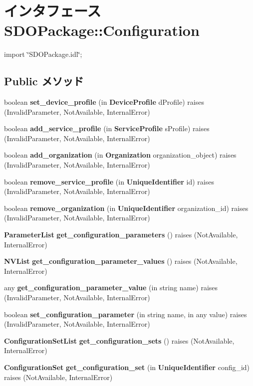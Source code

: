 \section{インタフェース SDOPackage::Configuration}
\label{interfaceSDOPackage_1_1Configuration}


{\ttfamily import \char`\"{}SDOPackage.idl\char`\"{};}

\subsection*{Public メソッド}
\begin{DoxyCompactItemize}
\item 
boolean {\bf set\_\-device\_\-profile} (in {\bf DeviceProfile} dProfile)  raises (InvalidParameter, NotAvailable, InternalError)
\item 
boolean {\bf add\_\-service\_\-profile} (in {\bf ServiceProfile} sProfile)  raises (InvalidParameter, NotAvailable, InternalError)
\item 
boolean {\bf add\_\-organization} (in {\bf Organization} organization\_\-object)  raises (InvalidParameter, NotAvailable, InternalError)
\item 
boolean {\bf remove\_\-service\_\-profile} (in {\bf UniqueIdentifier} id)  raises (InvalidParameter, NotAvailable, InternalError)
\item 
boolean {\bf remove\_\-organization} (in {\bf UniqueIdentifier} organization\_\-id)  raises (InvalidParameter, NotAvailable, InternalError)
\item 
{\bf ParameterList} {\bf get\_\-configuration\_\-parameters} ()  raises (NotAvailable, InternalError)
\item 
{\bf NVList} {\bf get\_\-configuration\_\-parameter\_\-values} ()  raises (NotAvailable, InternalError)
\item 
any {\bf get\_\-configuration\_\-parameter\_\-value} (in string name)  raises (InvalidParameter, NotAvailable, InternalError)
\item 
boolean {\bf set\_\-configuration\_\-parameter} (in string name, in any value)  raises (InvalidParameter, NotAvailable, InternalError)
\item 
{\bf ConfigurationSetList} {\bf get\_\-configuration\_\-sets} ()  raises (NotAvailable, InternalError)
\item 
{\bf ConfigurationSet} {\bf get\_\-configuration\_\-set} (in {\bf UniqueIdentifier} config\_\-id)  raises (NotAvailable, InternalError)

\end{DoxyCompactItemize}
